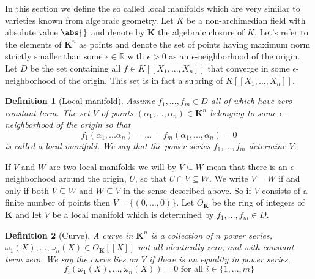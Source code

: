 \documentclass{article}
\newtheorem{definition}{Definition}[section]
\newcommand{\mbb}[1]{\mathbb{#1}}
\numberwithin{equation}{section}
\begin{document}
In this section we define the so called local manifolds which are very similar to varieties known from algebraic geometry. Let $K$ be a non-archimedian field with absolute value $\abs{}$ and denote by $\bm K$ the algebraic closure of $K$. Let's refer to the elements of $\bm K^n$ as points and denote the set of points having maximum norm strictly smaller than some $\epsilon \in \mbb R$ with $\epsilon > 0$ as an $\epsilon$-neighborhood of the origin. Let $D$ be the set containing all $f \in K[[X_1, ..., X_n]]$ that converge in some $\epsilon$-neighborhood of the origin. This set is in fact a subring of $K[[X_1, ..., X_n]]$.

\begin{definition}[Local manifold]
    Assume $f_1, ..., f_m \in D$ all of which have zero constant term. The set $V$ of points $(\alpha_1, ..., \alpha_n) \in \bm K^n$ belonging to some $\epsilon$-neighborhood of the origin so that $$f_1(\alpha_1, ... \alpha_n) = ... = f_m(\alpha_1, ..., \alpha_n) = 0$$
    is called a local manifold. We say that the power series $f_1, ..., f_m$ determine $V$.
\end{definition}
If $V$ and $W$ are two local manifolds we will by $V \subseteq W$ mean that there is an $\epsilon$-neighborhood around the origin, $U$, so that $U \cap V \subseteq W$. We write $V = W$ if and only if both $V \subseteq W$ and $W \subseteq V$ in the sense described above. So if $V$ consists of a finite number of points then $V = \{(0,...,0)\}$. Let $O_{\bm K}$ be the ring of integers of $\bm K$ and let $V$ be a local manifold which is determined by $f_1, ..., f_m \in D$.




\begin{definition}[Curve]
    A curve in $\bm{K}^n$ is a collection of $n$ power series, $\omega_1(X), ..., \omega_n(X) \in O_{\bm K}[[X]]$ not all identically zero, and with constant term zero. We say the curve lies on $V$ if there is an equality in power series, $$f_i(\omega_1(X), ..., \omega_n(X)) = 0 \text{ for all } i \in \{1, ..., m \}$$
\end{definition}
\end{document}
